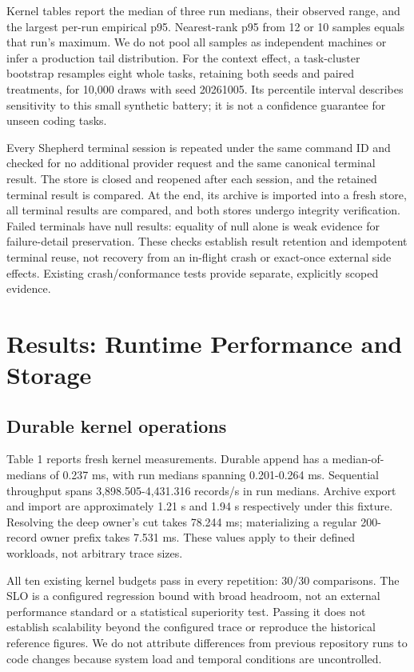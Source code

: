 \documentclass[11pt,a4paper]{article}
\begin{document}
Kernel tables report the median of three run medians, their observed range, and the largest per-run empirical p95. Nearest-rank p95 from 12 or 10 samples equals that run's maximum. We do not pool all samples as independent machines or infer a production tail distribution. For the context effect, a task-cluster bootstrap resamples eight whole tasks, retaining both seeds and paired treatments, for 10,000 draws with seed 20261005. Its percentile interval describes sensitivity to this small synthetic battery; it is not a confidence guarantee for unseen coding tasks.


Every Shepherd terminal session is repeated under the same command ID and checked for no additional provider request and the same canonical terminal result. The store is closed and reopened after each session, and the retained terminal result is compared. At the end, its archive is imported into a fresh store, all terminal results are compared, and both stores undergo integrity verification. Failed terminals have null results: equality of null alone is weak evidence for failure-detail preservation. These checks establish result retention and idempotent terminal reuse, not recovery from an in-flight crash or exact-once external side effects. Existing crash/conformance tests provide separate, explicitly scoped evidence.


\section{Results: Runtime Performance and Storage}

\subsection{Durable kernel operations}

Table 1 reports fresh kernel measurements. Durable append has a median-of-medians of 0.237 ms, with run medians spanning 0.201-0.264 ms. Sequential throughput spans 3,898.505-4,431.316 records/s in run medians. Archive export and import are approximately 1.21 s and 1.94 s respectively under this fixture. Resolving the deep owner's cut takes 78.244 ms; materializing a regular 200-record owner prefix takes 7.531 ms. These values apply to their defined workloads, not arbitrary trace sizes.


All ten existing kernel budgets pass in every repetition: 30/30 comparisons. The SLO is a configured regression bound with broad headroom, not an external performance standard or a statistical superiority test. Passing it does not establish scalability beyond the configured trace or reproduce the historical reference figures. We do not attribute differences from previous repository runs to code changes because system load and temporal conditions are uncontrolled.
\end{document}
